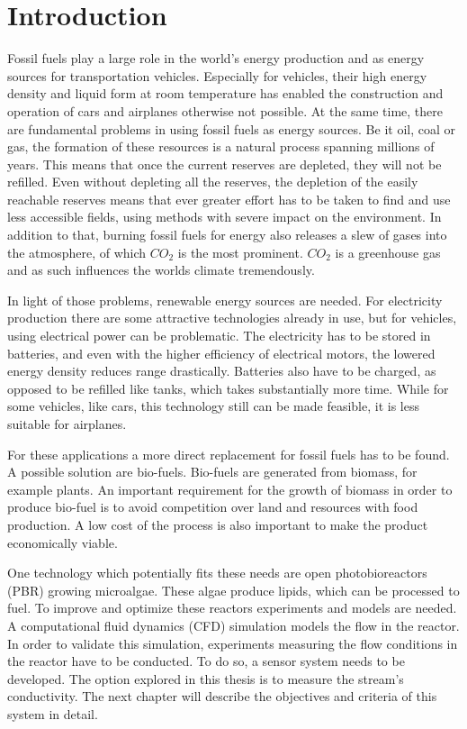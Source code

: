 \chapter{Introduction}

Fossil fuels play a large role in the world's energy production and as energy sources for transportation vehicles. Especially for vehicles, their high energy density and liquid form at room temperature has enabled the construction and operation of cars and airplanes otherwise not possible.
At the same time, there are fundamental problems in using fossil fuels as energy sources. Be it oil, coal or gas, the formation of these resources is a natural process spanning millions of years. This means that once the current reserves are depleted, they will not be refilled. Even without depleting all the reserves, the depletion of the easily reachable reserves means that ever greater effort has to be taken to find and use less accessible fields, using methods with severe impact on the environment.
In addition to that, burning fossil fuels for energy also releases a slew of gases into the atmosphere, of which $CO_{2}$ is the most prominent. $CO_{2}$ is a greenhouse gas and as such influences the worlds climate tremendously.

In light of those problems, renewable energy sources are needed. For electricity production there are some attractive technologies already in use, but for vehicles, using electrical power can be problematic. The electricity has to be stored in batteries, and even with the higher efficiency of electrical motors, the lowered energy density reduces range drastically. Batteries also have to be charged, as opposed to be refilled like tanks, which takes substantially more time. While for some vehicles, like cars, this technology still can be made feasible, it is less suitable for airplanes.

For these applications a more direct replacement for fossil fuels has to be found. A possible solution are bio-fuels. Bio-fuels are generated from biomass, for example plants. An important requirement for the growth of biomass in order to produce bio-fuel is to avoid competition over land and resources with food production. A low cost of the process is also important to make the product economically viable.

One technology which potentially fits these needs are open photobioreactors (PBR) growing microalgae. These algae produce lipids, which can be processed to fuel. To improve and optimize these reactors experiments and models are needed. A computational fluid dynamics (CFD) simulation models the flow in the reactor. In order to validate this simulation, experiments measuring the flow conditions in the reactor have to be conducted. To do so, a sensor system needs to be developed. The option explored in this thesis is to measure the stream's conductivity. The next chapter will describe the objectives and criteria of this system in detail.